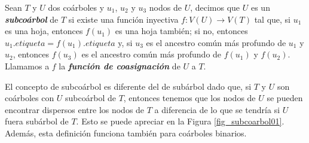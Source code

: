 \begin{definition}
    Sean $T$ y $U$ dos coárboles y $u_1$, $u_2$ y $u_3$ nodos de $U$, decimos que $U$ es un \emph{\textbf{subcoárbol}} de $T$ si existe una función inyectiva $f:V(U)\rightarrow V(T)$ tal que, si $u_1$ es una hoja, entonces $f(u_1)$ es una hoja también; si no, entonces $u_1.etiqueta = f(u_1).etiqueta$ y, si $u_3$ es el ancestro común más profundo de $u_1$ y $u_2$, entonces $f(u_3)$ es el ancestro común más profundo de $f(u_1)$ y $f(u_2)$. Llamamos a $f$ la \textbf{\emph{función de coasignación}} de $U$ a $T$.
\end{definition}

El concepto de subcoárbol es diferente del de subárbol dado que, si $T$ y $U$ son coárboles con $U$ subcoárbol de $T$, entonces tenemos que los nodos de $U$ se pueden encontrar dispersos entre los nodos de $T$ a diferencia de lo que se tendría si $U$ fuera subárbol de $T$. Esto se puede apreciar en la Figura \ref{fig_subcoarbol01}. Además, esta definición funciona también para coárboles binarios.

